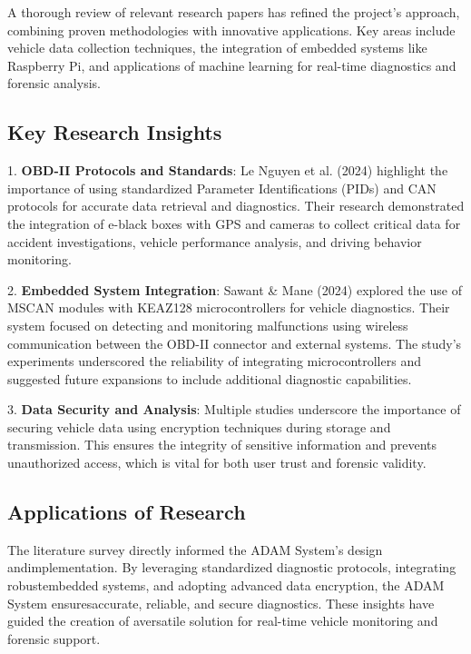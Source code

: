 A thorough review of relevant research papers has refined the project’s approach, combining proven methodologies with innovative applications. Key areas include vehicle data collection techniques, the integration of embedded systems like Raspberry Pi, and applications of machine learning for real-time diagnostics and forensic analysis.

\subsection{Key Research Insights}
1. \textbf{OBD-II Protocols and Standards}: Le Nguyen et al. (2024) highlight the importance of using standardized Parameter Identifications (PIDs) and CAN protocols for accurate data retrieval and diagnostics. Their research demonstrated the integration of e-black boxes with GPS and cameras to collect critical data for accident investigations, vehicle performance analysis, and driving behavior monitoring.

2. \textbf{Embedded System Integration}: Sawant \& Mane (2024) explored the use of MSCAN modules with KEAZ128 microcontrollers for vehicle diagnostics. Their system focused on detecting and monitoring malfunctions using wireless communication between the OBD-II connector and external systems. The study’s experiments underscored the reliability of integrating microcontrollers and suggested future expansions to include additional diagnostic capabilities.

3. \textbf{Data Security and Analysis}: Multiple studies underscore the importance of securing vehicle data using encryption techniques during storage and transmission. This ensures the integrity of sensitive information and prevents unauthorized access, which is vital for both user trust and forensic validity.

\subsection{ Applications of Research}
The literature survey directly informed the ADAM System’s design andimplementation. By leveraging standardized diagnostic protocols, integrating robustembedded systems, and adopting advanced data encryption, the ADAM System ensuresaccurate, reliable, and secure diagnostics. These insights have guided the creation of aversatile solution for real-time vehicle monitoring and forensic support.


